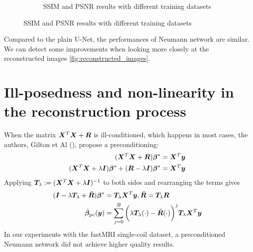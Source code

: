 \documentclass{article}
\begin{document}
\begin{figure}[H]
\begin{subfigure}[b]{.5\textwidth}
		\caption{SSIM and PSNR results with different training datasets}
    \end{subfigure}%
\end{figure}
Compared to the plain U-Net, the performances of Neumann network are similar. We can detect some improvements when looking more closely at the reconstructed images  \ref{fig:reconstructed_images}.

\section{Ill-posedness and non-linearity in the reconstruction process}
When the matrix $\bm{X}^T \bm{X} + \bm{R}$ is ill-conditioned, which happens in most cases, the authors, Gilton et Al (\cite{DBLP:journals/corr/abs-1901-03707}),  propose a preconditioning:
\begin{align*}
	(\bm{X}^T \bm{X} + \bm{R}) \bm{\beta}^{\ast} &=	\bm{X}^T \bm{y} \\
	(\bm{X}^T \bm{X} + \lambda \bm{I})  \bm{\beta}^{\ast} + ( \bm{R} -  \lambda \bm{I})   \bm{\beta}^{\ast} &= \bm{X}^T \bm{y} \\
\end{align*}
Applying $	\bm{T}_{\lambda} := (\bm{X}^T \bm{X} + \lambda \bm{I})^{-1}$ to both sides and rearranging the terms gives
\begin{align*}
	(\bm{I} - \lambda \bm{T}_{\lambda} + \tilde{\bm{R}}) \bm{\beta}^{\ast} &= \bm{T}_{\lambda} \bm{X}^T \bm{y}, 
	 \tilde{\bm{R}} =  \bm{T}_{\lambda} \bm{R} \\
\hat{\bm{\beta}}_{\text{pc}}(\bm{y})  &=  \sum_{j=0}^{B}  \bigg( \lambda  \bm{T}_{\lambda}(\cdot) -   \tilde{\bm{R}}(\cdot) \bigg)^j  \bm{T}_{\lambda} \bm{X}^T \bm{y} \\		 
\end{align*}
In our experiments with the fastMRI single-coil dataset, a preconditioned Neumann network did not achieve higher quality results.
\end{document}
